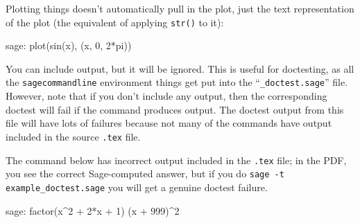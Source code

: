 \documentclass{article}
\begin{document}
Plotting things doesn't automatically pull in the plot, just the text
representation of the plot (the equivalent of applying \texttt{str()} to
it):

\begin{sagecommandline}
  sage: plot(sin(x), (x, 0, 2*pi))
\end{sagecommandline}

You can include output, but it will be ignored. This is useful for
doctesting, as all the \texttt{sagecommandline} environment things get
put into the ``\texttt{\_doctest.sage}'' file. However, note that if you
don't include any output, then the corresponding doctest will fail if
the command produces output. The doctest output from this file will have
lots of failures because not many of the commands have output included
in the source \texttt{.tex} file.

The command below has incorrect output included in the \texttt{.tex}
file; in the PDF, you see the correct Sage-computed answer, but if you
do \texttt{sage -t example\_doctest.sage} you will get a genuine doctest
failure.
\begin{sagecommandline}
  sage: factor(x^2 + 2*x + 1)
  (x + 999)^2
\end{sagecommandline}
\end{document}
